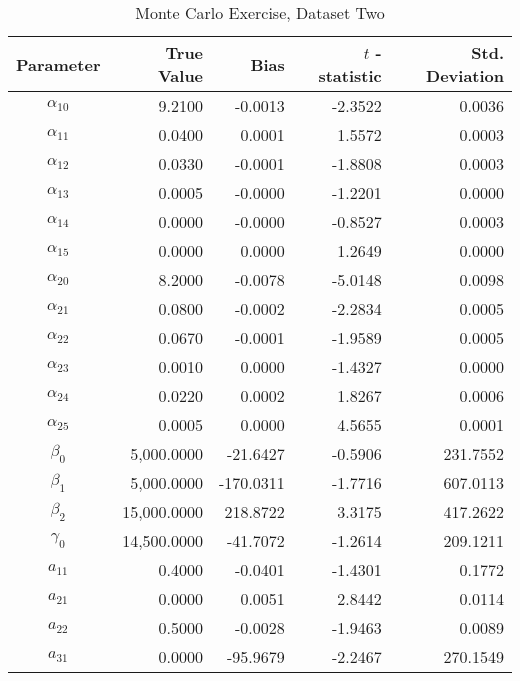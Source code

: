 \begin{table}\onehalfspacing
\begin{center}
\begin{threeparttable}
  \caption{Monte Carlo Exercise, Dataset Two}
  \label{Monte Carlo: Two}
  \begin{tabular}{crrrr}\toprule

  Parameter & True Value & Bias & $t$ - statistic & Std. Deviation \\
  \midrule
  $\alpha_{10}$ &      \phantom{20000}9.2100 &  -0.0013 & -2.3522 &     0.0036 \\
  $\alpha_{11}$ &      0.0400 &      0.0001 &  1.5572 &    0.0003 \\
  $\alpha_{12}$ &      0.0330 &     -0.0001 & -1.8808 &    0.0003 \\
  $\alpha_{13}$ &      0.0005 &     -0.0000 & -1.2201 &    0.0000 \\
  $\alpha_{14}$ &      0.0000 &     -0.0000 & -0.8527 &    0.0003 \\
  $\alpha_{15}$ &      0.0000 &      0.0000 &  1.2649 &    0.0000 \\
  $\alpha_{20}$ &      8.2000 &     -0.0078 & -5.0148 &    0.0098 \\
  $\alpha_{21}$ &      0.0800 &     -0.0002 & -2.2834 &    0.0005 \\
  $\alpha_{22}$ &      0.0670 &     -0.0001 & -1.9589 &    0.0005 \\
  $\alpha_{23}$ &      0.0010 &      0.0000 & -1.4327 &    0.0000\\
  $\alpha_{24}$ &      0.0220 &      0.0002 &  1.8267 &    0.0006 \\
  $\alpha_{25}$ &      0.0005 &      0.0000 &  4.5655 &    0.0001\\
  $\beta_{0}$   &   5,000.0000 &   -21.6427 & -0.5906 &  231.7552 \\
  $\beta_{1}$   &   5,000.0000 &  -170.0311 & -1.7716 &  607.0113 \\
  $\beta_{2}$   &  15,000.0000 &   218.8722 &  3.3175 &  417.2622 \\
  $\gamma_{0}$  &  14,500.0000 &   -41.7072 & -1.2614 &  209.1211 \\
  $a_{11}$      &      0.4000 &     -0.0401 & -1.4301 &    0.1772 \\
  $a_{21}$      &      0.0000 &      0.0051 &  2.8442 &    0.0114 \\
  $a_{22}$      &      0.5000 &     -0.0028 & -1.9463 &    0.0089 \\
  $a_{31}$      &      0.0000 &    -95.9679 & -2.2467 &  270.1549 \\

\end{tabular}
\end{threeparttable}
\end{center}
\end{table}
